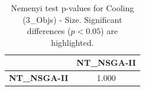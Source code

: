 \begin{table}[h!]
\centering
\scriptsize
\begin{tabular}{lc}
\toprule
 & NT\_NSGA-II \\
\midrule
\textbf{NT\_NSGA-II} & 1.000 \\
\bottomrule
\end{tabular}
\caption{Nemenyi test p-values for Cooling (3_Objs) - Size. Significant differences ($p < 0.05$) are highlighted.}
\label{tab:nemenyi_nemenyi_Cooling_3_Objs_Test_Size}
\end{table}